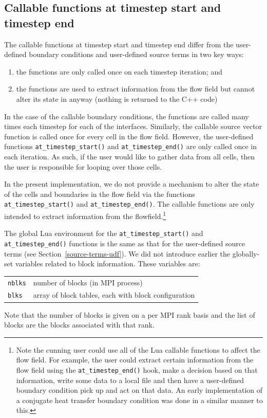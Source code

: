\subsection{Callable functions at timestep start and timestep end}
\label{start-end-timestep-udf}
The callable functions at timestep start and timestep end differ
from the user-defined boundary conditions and user-defined source terms
in two key ways:
\begin{enumerate}
\item the functions are only called once on each timestep iteration; and
\item the functions are used to extract information from the flow field
      but cannot alter its state in anyway (nothing is returned to the
      C++ code)
\end{enumerate}

In the case of the callable boundary conditions, the functions are called many times
each timestep for each of the interfaces.
Similarly, the callable source vector function is called once for every cell in 
the flow field.
However, the user-defined functions \verb!at_timestep_start()! and \verb!at_timestep_end()!
are only called once in each iteration.
As such, if the user would like to gather data from all cells,
then the user is responsible for looping over those cells.

In the present implementation, we do not provide a mechanism to alter the
state of the cells and boundaries in the flow field via the functions
\verb!at_timestep_start()! and \verb!at_timestep_end()!.
The callable functions are only intended to extract information from the
flowfield.\footnote{Note the cunning user could use all of the Lua callable functions
to affect the flow field.
For example, the user could extract certain information from
the flow field using the \texttt{at\_timestep\_end()} hook, make a decision based on that information,
write some data to a local file and then have a user-defined boundary condition pick
up and act on that data.
An early implementation of a conjugate heat transfer boundary
condition was done in a similar manner to this.}

The global Lua environment for the \verb!at_timestep_start()! and \verb!at_timestep_end()!
functions is the same as that for the user-defined source terms (see Section~\ref{source-terms-udf}).
We did not introduce earlier the globally-set variables related to block information.
These variables are:\\
\begin{tabular}{ll}
 \texttt{nblks} & number of blocks (in MPI process) \\
 \texttt{blks}  & array of block tables, each with block configuration \\
\end{tabular}
Note that the number of blocks is given on a per MPI rank basis and
the list of blocks are the blocks associated with that rank.

